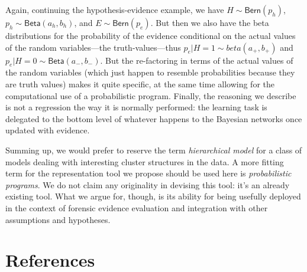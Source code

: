 \documentclass[
  10pt,
  dvipsnames,enabledeprecatedfontcommands]{scrartcl}
\begin{document}
Again, continuing the hypothesis-evidence example, we have
\(H \sim \mathsf{Bern}(p_h)\), \(p_h \sim \mathsf{Beta}(a_h, b_h)\), and
\(E\sim \mathsf{Bern}(p_e)\). But then we also have the beta
distributions for the probability of the evidence conditional on the
actual values of the random variables---the truth-values---thus
\(p_e \vert H = 1 \sim beta(a_{+}, b_{+} )\) and
\(p_e \vert H = 0 \sim \mathsf{Beta}(a_{-}, b_{-})\). But the
re-factoring in terms of the actual values of the random variables
(which just happen to resemble probabilities because they are truth
values) makes it quite specific, at the same time allowing for the
computational use of a probabilistic program. Finally, the reasoning we
describe is not a regression the way it is normally performed: the
learning task is delegated to the bottom level of whatever happens to
the Bayesian networks once updated with evidence.

Summing up, we would prefer to reserve the term
\emph{hierarchical model} for a class of models dealing with interesting
cluster structures in the data. A more fitting term for the
representation tool we propose should be used here is
\emph{probabilistic programs}. We do not claim any originality in
devising this tool: it's an already existing tool. What we argue for,
though, is its ability for being usefully deployed in the context of
forensic evidence evaluation and integration with other assumptions and
hypotheses.

\section*{References}\label{references}
\end{document}
